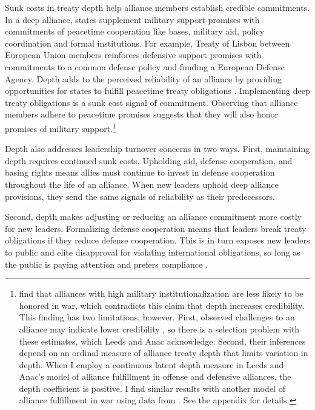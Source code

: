 \documentclass[12pt]{article}
\begin{document}
Sunk costs in treaty depth help alliance members establish credible commitments.
In a deep alliance, states supplement military support promises with commitments of peacetime cooperation like bases, military aid, policy coordination and formal institutions. 
For example, Treaty of Lisbon between European Union members reinforces defensive support promises with commitments to a common defense policy and funding a European Defense Agency. 
Depth adds to the perceived reliability of an alliance by providing opportunities for states to fulfill peacetime treaty obligations \citep{Morrow1994}. 
Implementing deep treaty obligations is a sunk cost signal of commitment.
Observing that alliance members adhere to peacetime promises suggests that they will also honor promises of military support.\footnote{\citet{LeedsAnac2005} find that alliances with high military institutionalization are less likely to be honored in war, which contradicts this claim that depth increases credibility. 
This finding has two limitations, however. 
First, observed challenges to an alliance may indicate lower credibility \citep{Smith1995}, so there is a selection problem with these estimates, which Leeds and Anac acknowledge. 
Second, their inferences depend on an ordinal measure of alliance treaty depth that limits variation in depth. 
When I employ a continuous latent depth measure in Leeds and Anac's model of alliance fulfillment in offense and defensive alliances, the depth coefficient is positive. 
I find similar results with another model of alliance fulfillment in war using data from \citet{BerkemeierFuhrmann2018}.
See the appendix for details.} 


Depth also addresses leadership turnover concerns in two ways. 
First, maintaining depth requires continued sunk costs.
Upholding aid, defense cooperation, and basing rights means allies must continue to invest in defense cooperation throughout the life of an alliance. 
When new leaders uphold deep alliance provisions, they send the same signals of reliability as their predecessors. 


Second, depth makes adjusting or reducing an alliance commitment more costly for new leaders. 
Formalizing defense cooperation means that leaders break treaty obligations if they reduce defense cooperation. 
This is in turn exposes new leaders to public and elite disapproval for violating international obligations, so long as the public is paying attention \citep{Slantchev2006, PotterBaum2014} and prefers compliance \citep{Chaudoin2014, KertzerBrutger2016}.
\end{document}
